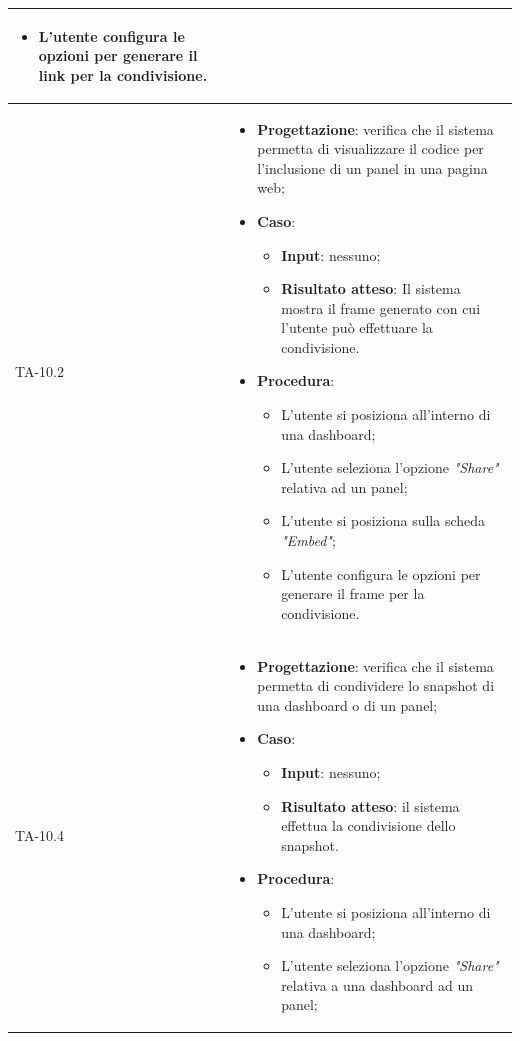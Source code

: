 \begin{longtable}{|C{2.5cm}|C{13cm}|}
\begin{itemize}
\begin{itemize}
		\item L'utente configura le opzioni per generare il link per la condivisione.
	\end{itemize} 
\end{itemize}\\
\hline
{TA-10.2} &
\begin{itemize}
	\item \textbf{Progettazione}: verifica che il sistema permetta di visualizzare il codice per l'inclusione di un panel in una pagina web;
	\item \textbf{Caso}: 
	\begin{itemize}
		\item \textbf{Input}: nessuno;
		\item \textbf{Risultato atteso}: Il sistema mostra il frame generato con cui l'utente può effettuare la condivisione.
	\end{itemize}
	\item \textbf{Procedura}:
	\begin{itemize}
		\item L'utente si posiziona all'interno di una dashboard;
		\item L'utente seleziona l'opzione \emph{"Share"} relativa ad un panel;
		\item L'utente si posiziona sulla scheda \emph{"Embed"};
		\item L'utente configura le opzioni per generare il frame per la condivisione.
	\end{itemize} 
\end{itemize}\\
\hline
{TA-10.4} &
\begin{itemize}
	\item \textbf{Progettazione}: verifica che il sistema permetta di condividere lo snapshot di una dashboard o di un
	panel;
	\item \textbf{Caso}: 
	\begin{itemize}
		\item \textbf{Input}: nessuno;
		\item \textbf{Risultato atteso}: il sistema effettua la condivisione dello snapshot.
	\end{itemize}
	\item \textbf{Procedura}:
	\begin{itemize}
		\item L'utente si posiziona all'interno di una dashboard;
		\item L'utente seleziona l'opzione \emph{"Share"} relativa a una dashboard ad un panel;

\end{itemize}
\end{itemize}
\end{longtable}
